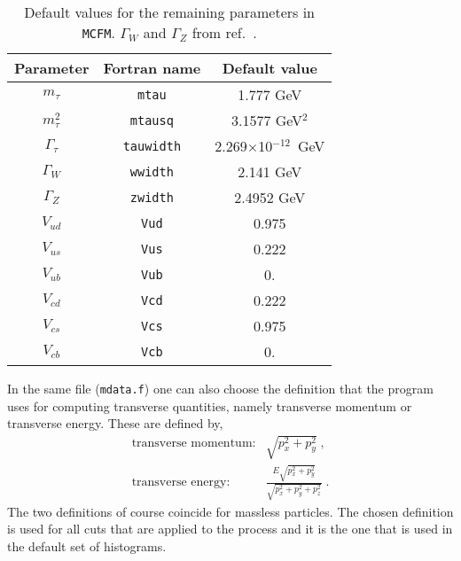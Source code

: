 \documentclass[12pt]{article}
\begin{document}
\begin{table}
\begin{center}
\begin{tabular}{|c|c|c|} \hline
Parameter & Fortran name & Default value \\ 
\hline
$m_\tau$         & {\tt mtau}      & 1.777 GeV            \\
$m^2_\tau$& {\tt mtausq}  & 3.1577 GeV$^2$     \\
$\Gamma_\tau$    & {\tt tauwidth}& 2.269$\times$10$^{-12}$~GeV \\
$\Gamma_W$       & {\tt wwidth}  & 2.141 GeV               \\
$\Gamma_Z$       & {\tt zwidth}  & 2.4952 GeV               \\
$V_{ud}$         & {\tt Vud}     & 0.975                  \\
$V_{us}$         & {\tt Vus}     & 0.222             \\
$V_{ub}$         & {\tt Vub}     & 0.                     \\
$V_{cd}$         & {\tt Vcd}     & 0.222             \\
$V_{cs}$         & {\tt Vcs}     & 0.975                  \\
$V_{cb}$         & {\tt Vcb}     & 0.                     \\
\hline
\end{tabular}
\caption{Default values for the remaining parameters in {\tt MCFM}.
$\Gamma_W$ and $\Gamma_Z$ from ref.~\cite{Amsler:2008zzb}.}
\label{default} 
\end{center}
\end{table}

In the same file ({\tt mdata.f}) one can also choose the definition
that the program uses for computing transverse quantities, namely
transverse momentum or transverse energy. These are defined by,
\begin{eqnarray}
\mbox{transverse momentum:} & \sqrt{p_x^2+p_y^2} \; ,\nonumber \\
\mbox{transverse energy:}   &
 \frac{E \sqrt{p_x^2+p_y^2}}{\sqrt{p_x^2+p_y^2+p_z^2}} \; .
\end{eqnarray}
The two definitions of course coincide for massless particles.
The chosen definition is used for all cuts that are applied to the
process and it is the one that is used in the default set of histograms.
\end{document}
